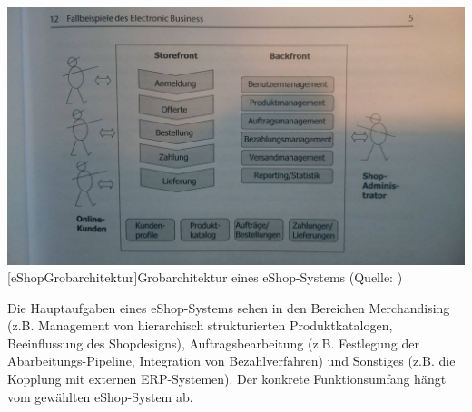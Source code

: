 \documentclass[12pt,a4paper,bibliography=totocnumbered,listof=totoc]{scrartcl}
\begin{document}
\vspace{1em}
\begin{minipage}{\linewidth}
	\centering
	\includegraphics[width=0.7\linewidth]{Abbildungen/eShopGrobarchitektur.jpg}
	[eShopGrobarchitektur]{Grobarchitektur eines eShop-Systems (Quelle: \citet{meier12})}
	\label{fig:eShopGrobarchitektur}
\end{minipage}
\vspace{1em}

Die Hauptaufgaben eines eShop-Systems sehen \citet{boles00} in den Bereichen Merchandising (z.B. Management von hierarchisch strukturierten Produktkatalogen, Beeinflussung des Shopdesigns), Auftragsbearbeitung (z.B. Festlegung der Abarbeitungs-Pipeline, Integration von Bezahlverfahren) und Sonstiges (z.B. die Kopplung mit externen ERP-Systemen). Der konkrete Funktionsumfang hängt vom  gewählten eShop-System ab.
\end{document}

